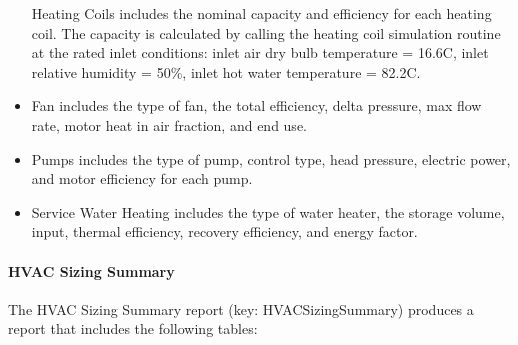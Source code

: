 \begin{itemize}
  Heating Coils includes the nominal capacity and efficiency for each heating coil. The capacity is calculated by calling the heating coil simulation routine at the rated inlet conditions: inlet air dry bulb temperature = 16.6C, inlet relative humidity = 50\%, inlet hot water temperature = 82.2C.
\item
  Fan includes the type of fan, the total efficiency, delta pressure, max flow rate, motor heat in air fraction, and end use.
\item
  Pumps includes the type of pump, control type, head pressure, electric power, and motor efficiency for each pump.
\item
  Service Water Heating includes the type of water heater, the storage volume, input, thermal efficiency, recovery efficiency, and energy factor.
\end{itemize}

\paragraph{HVAC Sizing Summary}\label{hvac-sizing-summary}

The HVAC Sizing Summary report (key: HVACSizingSummary) produces a report that includes the following tables:


